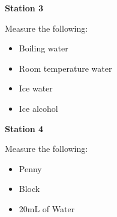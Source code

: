 \documentclass[14pt, fleqn, paper=letter, oneside, twocolumn]{scrartcl}
\begin{document}
\vfill

\textbf{\LARGE Station 3}

Measure the following:
\begin{itemize}
\item Boiling water
\item Room temperature water
\item Ice water
\item Ice alcohol
\end{itemize}

\vfill

\textbf{\LARGE Station 4}

Measure the following:
\begin{itemize}
\item Penny
\item Block
\item 20mL of Water
\end{itemize}
\end{document}
